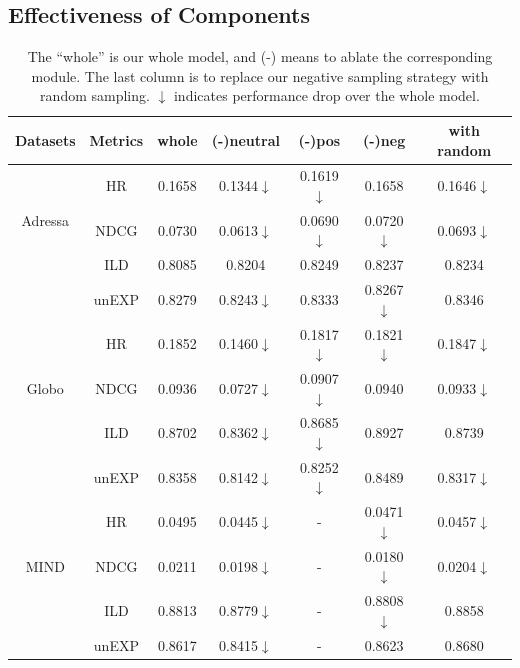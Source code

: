 \subsection{Effectiveness of Components}
\begin{table}[th]\setlength{\tabcolsep}{3.5pt}
  \caption{The ``whole'' is our whole model, and (-) means to ablate the corresponding module. The last column is to replace our negative sampling strategy with random sampling. 
  $\downarrow$ indicates performance drop over the whole model.}
    \label{ablation}
   \renewcommand{\arraystretch}{1.3}
    \centering
    \begin{tabular}{|c|c|ccccc|}
    \hline
    Datasets&Metrics&whole&(-)neutral&(-)pos&(-)neg& with random\\ 
    \hline
    \multirow{3}{*}{Adressa} & HR & 0.1658 & 0.1344$\downarrow$ & 0.1619$\downarrow$ & 0.1658 &0.1646$\downarrow$\\ 
    \cline{2-7}
    & NDCG & 0.0730 & 0.0613$\downarrow$ & 0.0690$\downarrow$ & 0.0720$\downarrow$ &0.0693$\downarrow$\\ 
    \cline{2-7}
    & ILD & 0.8085 & 0.8204 & 0.8249 & 0.8237 &0.8234\\ 
    \cline{2-7}
    & unEXP & 0.8279 & 0.8243$\downarrow$ & 0.8333 & 0.8267$\downarrow$ &0.8346\\ 
    \hline
    \multirow{3}{*}{Globo} & HR & 0.1852 & 0.1460$\downarrow$ & 0.1817$\downarrow$ & 0.1821$\downarrow$ &0.1847$\downarrow$\\ 
    \cline{2-7}
    & NDCG & 0.0936 & 0.0727$\downarrow$ & 0.0907$\downarrow$ & 0.0940 &0.0933$\downarrow$\\ 
    \cline{2-7}
    & ILD & 0.8702 & 0.8362$\downarrow$ & 0.8685$\downarrow$ & 0.8927 &0.8739\\ 
    \cline{2-7}
    & unEXP & 0.8358 & 0.8142$\downarrow$ & 0.8252$\downarrow$ & 0.8489& 0.8317$\downarrow$\\ 
    \hline
    \multirow{3}{*}{MIND} & HR & 0.0495 & 0.0445$\downarrow$ & - & 0.0471$\downarrow$ &0.0457$\downarrow$\\ 
    \cline{2-7}
    & NDCG & 0.0211 & 0.0198$\downarrow$ & - & 0.0180$\downarrow$ &0.0204$\downarrow$\\
    \cline{2-7} 
    & ILD & 0.8813 & 0.8779$\downarrow$ & - & 0.8808$\downarrow$ &0.8858\\
    \cline{2-7}
    & unEXP & 0.8617 & 0.8415$\downarrow$ & - & 0.8623&0.8680\\  
    \hline
  \end{tabular}
  \end{table}
